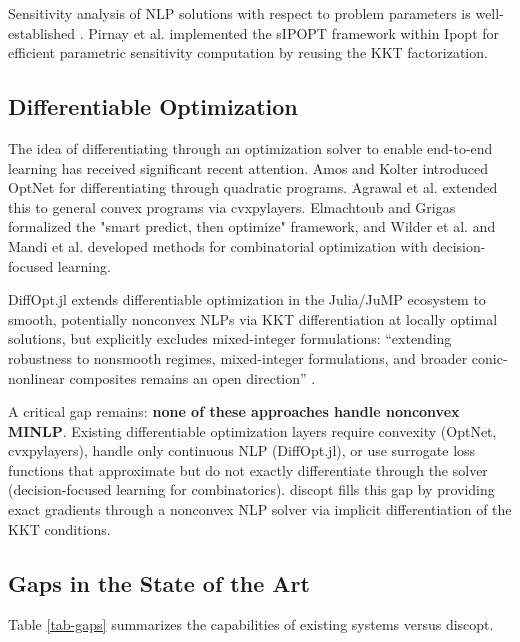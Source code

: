 \documentclass[12pt,preprint]{article}
\begin{document}
Sensitivity analysis of NLP solutions with respect to problem parameters is well-established \cite{Fiacco1983}. Pirnay et al. \cite{Pirnay2012} implemented the sIPOPT framework within Ipopt for efficient parametric sensitivity computation by reusing the KKT factorization.

\subsection{Differentiable Optimization}
\label{org-differentiable-optimization-background}
The idea of differentiating through an optimization solver to enable end-to-end learning has received significant recent attention. Amos and Kolter \cite{Amos2017} introduced OptNet for differentiating through quadratic programs. Agrawal et al. \cite{Agrawal2019} extended this to general convex programs via cvxpylayers. Elmachtoub and Grigas \cite{Elmachtoub2022} formalized the "smart predict, then optimize" framework, and Wilder et al. \cite{Wilder2019} and Mandi et al. \cite{Mandi2020} developed methods for combinatorial optimization with decision-focused learning.


DiffOpt.jl \cite{DiffOpt2025} extends differentiable optimization in the Julia/JuMP ecosystem to smooth, potentially nonconvex NLPs via KKT differentiation at locally optimal solutions, but explicitly excludes mixed-integer formulations: ``extending robustness to nonsmooth regimes, mixed-integer formulations, and broader conic-nonlinear composites remains an open direction'' \cite{DiffOpt2025}.

A critical gap remains: \textbf{none of these approaches handle nonconvex MINLP}. Existing differentiable optimization layers require convexity (OptNet, cvxpylayers), handle only continuous NLP (DiffOpt.jl), or use surrogate loss functions that approximate but do not exactly differentiate through the solver (decision-focused learning for combinatorics). discopt fills this gap by providing exact gradients through a nonconvex NLP solver via implicit differentiation of the KKT conditions.

\subsection{Gaps in the State of the Art}
\label{org-gaps-in-the-state-of-the-art}
Table \ref{tab-gaps} summarizes the capabilities of existing systems versus discopt.
\end{document}
